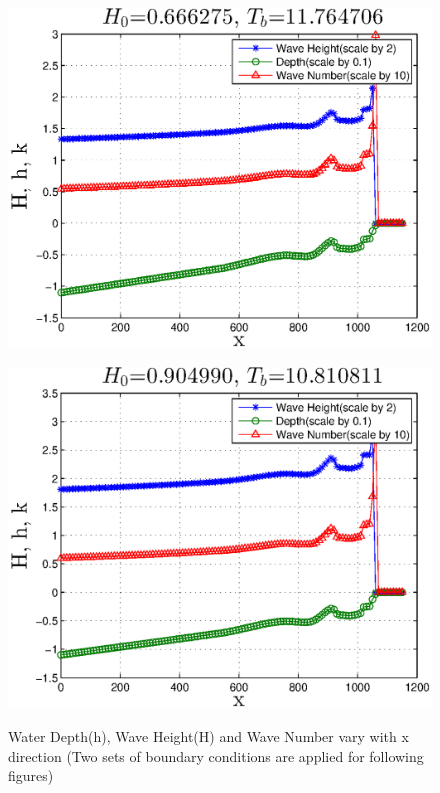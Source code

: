 \begin{figure}[h]
\begin{minipage}[b]{0.47\linewidth}
\centering
\includegraphics[width=\textwidth]{forward_plot/p1_1.eps}
\label{FigHhk_1}
\end{minipage}
\hspace{0.2cm}
\begin{minipage}[b]{0.47\linewidth}
\centering
\includegraphics[width=\textwidth]{forward_plot/p2_1.eps}
\label{FigHhk_2}
\end{minipage}
\caption{Water Depth(h), Wave Height(H) and Wave Number vary with x direction (Two sets of boundary conditions are applied for following figures)}
\end{figure}


